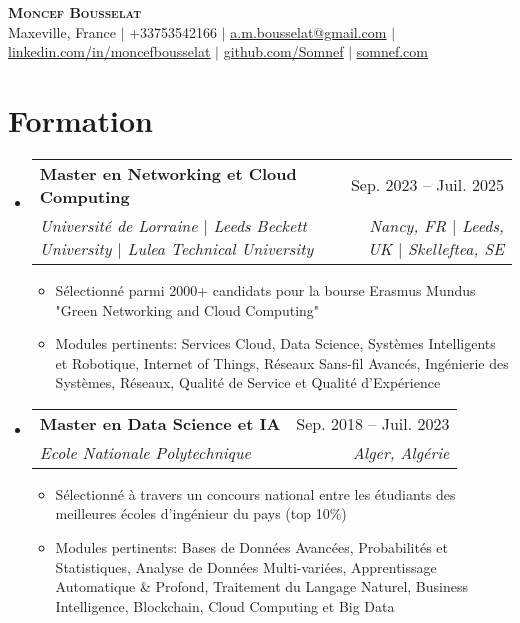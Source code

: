 \documentclass[letterpaper,10.5t]{article}
\makeatletter
\newcommand{\resumeItem}[1]{
  \item\small{
    {#1 \vspace{-2pt}}
  }
}
\newcommand{\resumeSubheading}[4]{
  \vspace{-2pt}\item
    \begin{tabular*}{0.97\textwidth}[t]{l@{\extracolsep{\fill}}r}
      \textbf{#1} & #2 \\
      \textit{\small#3} & \textit{\small #4} \\
    \end{tabular*}\vspace{-7pt}
}
\newcommand{\resumeSubHeadingListStart}{\begin{itemize}[leftmargin=0.15in, label={}]}
\newcommand{\resumeSubHeadingListEnd}{\end{itemize}}
\newcommand{\resumeItemListStart}{\begin{itemize}}
\newcommand{\resumeItemListEnd}{\end{itemize}\vspace{-5pt}}
\makeatother
\begin{document}

\begin{center}
    \textbf{\Huge \scshape Moncef Bousselat} \\ \vspace{1pt}
    \small Maxeville, France $|$ 
    \small +33753542166 $|$ 
    \href{mailto:a.m.bousselat@gmail.com@gmail.com}{\underline{a.m.bousselat@gmail.com}} $|$ 
    \href{https://www.linkedin.com/in/moncefbousselat/}{\underline{linkedin.com/in/moncefbousselat}} $|$
    \href{https://github.com/Somnef}{\underline{github.com/Somnef}} $|$
    \href{https://www.somnef.com}{\underline{somnef.com}}
\end{center}


\section{Formation}
    \resumeSubHeadingListStart
        \resumeSubheading
        {Master en Networking et Cloud Computing}{Sep. 2023 -- Juil. 2025}
        {Université de Lorraine $|$ Leeds Beckett University $|$ Lulea Technical University}{Nancy, FR $|$ Leeds, UK $|$ Skelleftea, SE}
            \resumeItemListStart
                \resumeItem{Sélectionné parmi 2000+ candidats pour la bourse Erasmus Mundus "Green Networking and Cloud Computing"}
                \resumeItem{Modules pertinents: Services Cloud, Data Science, Systèmes Intelligents et Robotique, Internet of Things, Réseaux Sans-fil Avancés, Ingénierie des Systèmes, Réseaux, Qualité de Service et Qualité d'Expérience}
            \resumeItemListEnd
      
        \resumeSubheading
        {Master en Data Science et IA}{Sep. 2018 -- Juil. 2023}
        {Ecole Nationale Polytechnique}{Alger, Algérie}
            \resumeItemListStart
                \resumeItem{Sélectionné à travers un concours national entre les étudiants des meilleures écoles d'ingénieur du pays (top 10\%)}
                \resumeItem{Modules pertinents: Bases de Données Avancées, Probabilités et Statistiques, Analyse de Données Multi-variées, Apprentissage Automatique \& Profond, Traitement du Langage Naturel, Business Intelligence, Blockchain, Cloud Computing et Big Data}
            \resumeItemListEnd
  \resumeSubHeadingListEnd
\end{document}
